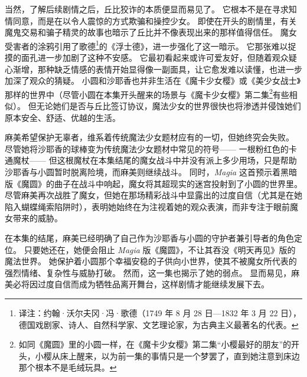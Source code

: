 当然，了解后续剧情之后，丘比狡诈的本质便显而易见了。
它根本不是在寻求知情同意，而是在以令人震惊的方式欺骗和操控少女。
即使在开头的剧情里，有关魔鬼交易和骗子精灵的故事也暗示了丘比并不像表现出来的那样值得信任。
魔女受害者的涂鸦引用了歌德\footnote{%
    译注：约翰·沃尔夫冈·冯·歌德（1749 年 8 月 28 日—1832 年 3 月 22 日），德国戏剧家、诗人、自然科学家、文艺理论家，为古典主义最著名的代表。
}的《浮士德》，进一步强化了这一暗示。
它那张难以捉摸的面孔进一步加剧了这种不安感。
它最初看起来或许可爱友好，但随着观众疑心渐增，那种缺乏情感的表情开始显得像一副面具，让它愈发难以读懂，也进一步加深了观众的猜疑。
小圆和沙耶香也并非生活在《魔卡少女樱》或《美少女战士》那样的世界中（尽管小圆在本集开头醒来的场景与《魔卡少女樱》第二集\footnote{%
    如同《魔圆》里的小圆一样，在《魔卡少女樱》第二集“小樱最好的朋友”的开头，小樱从床上醒来，以为前一集的事情只是一个梦罢了，直到她注意到床边那个根本不是毛绒玩具。
}\cite{ref24}有些相似）。
但无论她们是否与丘比签订协议，魔法少女的世界很快也将渗透并侵蚀她们原本安全、舒适、优越的生活。

麻美希望保护无辜者，维系着传统魔法少女题材应有的一切，但她终究会失败。
尽管她将沙耶香的球棒变为传统魔法少女题材中常见的符号——
一根粉红色的卡通魔杖——
但这根魔杖在本集结尾的魔女战斗中并没有派上多少用场，只是帮助沙耶香与小圆暂时脱离险境，而麻美则继续战斗。
同时，\emph{Magia} 这首预示着黑暗版《魔圆》的曲子在战斗中响起，魔女将其超现实的迷宫投射到了小圆的世界里。
尽管麻美再次战胜了魔女，但她在那场精彩战斗中显露出的过度自信（尤其是在她陷入蝴蝶绳索陷阱时），表明她始终在为注视着她的观众表演，而非专注于眼前魔女带来的威胁。

在本集的结尾，麻美已经明确了自己作为沙耶香与小圆的守护者兼引导者的角色定位。
只要她还在，她便会阻止 \emph{Magia} 版《魔圆》，不让其吞没《明天再见》版的魔法世界。
她保护着小圆那个幸福安稳的子供向小世界，使其不被魔女所代表的强烈情绪、复杂性与威胁打破。
然而，这一集也揭示了她的弱点。
显而易见，麻美必将因过度自信而成为牺牲品离开舞台，这样剧情才能继续发展下去。

